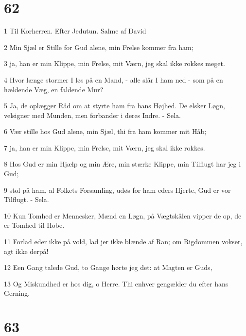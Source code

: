 \chapter{62}

\par 1 Til Korherren. Efter Jedutun. Salme af David
\par 2 Min Sjæl er Stille for Gud alene, min Frelse kommer fra ham;
\par 3 ja, han er min Klippe, min Frelse, mit Værn, jeg skal ikke rokkes meget.
\par 4 Hvor længe stormer I løs på en Mand, - alle slår I ham ned - som på en hældende Væg, en faldende Mur?
\par 5 Ja, de oplægger Råd om at styrte ham fra hans Højhed. De elsker Løgn, velsigner med Munden, men forbander i deres Indre. - Sela.
\par 6 Vær stille hos Gud alene, min Sjæl, thi fra ham kommer mit Håb;
\par 7 ja, han er min Klippe, min Frelse, mit Værn, jeg skal ikke rokkes.
\par 8 Hos Gud er min Hjælp og min Ære, min stærke Klippe, min Tilflugt har jeg i Gud;
\par 9 stol på ham, al Folkets Forsamling, udøs for ham eders Hjerte, Gud er vor Tilflugt. - Sela.
\par 10 Kun Tomhed er Mennesker, Mænd en Løgn, på Vægtskålen vipper de op, de er Tomhed til Hobe.
\par 11 Forlad eder ikke på vold, lad jer ikke blænde af Ran; om Rigdommen vokser, agt ikke derpå!
\par 12 Een Gang talede Gud, to Gange hørte jeg det: at Magten er Guds,
\par 13 Og Miskundhed er hos dig, o Herre. Thi enhver gengælder du efter hans Gerning.

\chapter{63}

